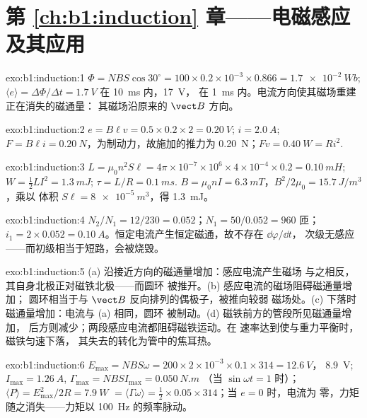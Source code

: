 \section*{第 \ref{ch:b1:induction} 章——电磁感应及其应用}

\begin{solution}{exo:b1:induction:1}
$\Phi = NBS\cos30^\circ = 100 \times 0.2 \times 10^{-3} \times 0.866 = \qty{1.7e-2}{Wb}$;
$\langle e\rangle = \Delta\Phi/\Delta t = \qty{1.7}{V}$ 在 \qty{10}{ms} 内，\qty{17}{V}，
在 \qty{1}{ms} 内。电流方向使其磁场重建正在消失的磁通量：
其磁场沿原来的 $\vect B$ 方向。
\end{solution}

\begin{solution}{exo:b1:induction:2}
$e = B\ell v = 0.5 \times 0.2 \times 2 = \qty{0.20}{V}$; $i = \qty{2.0}{A}$; $F = B\ell i =
\qty{0.20}{N}$，为制动力，故施加的推力为 \qty{0.20}{N}；$Fv = \qty{0.40}{W}
= Ri^2$.
\end{solution}

\begin{solution}{exo:b1:induction:3}
$L = \mu_0n^2S\ell = 4\pi \times 10^{-7} \times 10^6 \times 4 \times 10^{-4} \times 0.2 =
\qty{0.10}{mH}$; $W = \tfrac12LI^2 = \qty{1.3}{mJ}$; $\tau = L/R = \qty{0.1}{ms}$.
$B = \mu_0nI = \qty{6.3}{mT}$，$B^2/2\mu_0 = \qty{15.7}{J/m^3}$，乘以
体积 $S\ell = \qty{8e-5}{m^3}$，得 \qty{1.3}{mJ}。
\end{solution}

\begin{solution}{exo:b1:induction:4}
$N_2/N_1 = 12/230 = 0.052$；$N_1 = 50/0.052 = 960$ 匝；$i_1 = 2 \times 0.052 =
\qty{0.10}{A}$。恒定电流产生恒定磁通，故不存在 $\dd\varphi/\dd t$，
次级无感应——而初级相当于短路，会被烧毁。
\end{solution}

\begin{solution}{exo:b1:induction:5}
(a) 沿接近方向的磁通量增加：感应电流产生磁场
与之相反，其自身北极正对磁铁北极——而圆环
被推开。(b) 感应电流的磁场阻碍磁通量增加；
圆环相当于与 $\vect B$ 反向排列的偶极子，被推向较弱
磁场处。(c) 下落时磁通量增加：电流与 (a) 相同，圆环
被制动。(d) 磁铁前方的管段所见磁通量增加，
后方则减少；两段感应电流都阻碍磁铁运动。在
速率达到使与重力平衡时，磁铁匀速下落，
其失去的转化为管中的焦耳热。
\end{solution}

\begin{solution}{exo:b1:induction:6}
$E_{\max} = NBS\omega = 200 \times 2 \times 10^{-3} \times 0.1 \times 314 = \qty{12.6}{V}$，
\qty{8.9}{V}; $I_{\max} = \qty{1.26}{A}$, $\Gamma_{\max} = NBSI_{\max} = \qty{0.050}{N.m}$
（当 $\sin\omega t = 1$ 时）；$\langle P\rangle = E_{\max}^2/2R = \qty{7.9}{W}$ $=
\langle\Gamma\omega\rangle = \tfrac12 \times 0.05 \times 314$；当 $e = 0$ 时，电流为
零，力矩随之消失——力矩以 \qty{100}{Hz} 的频率脉动。
\end{solution}

